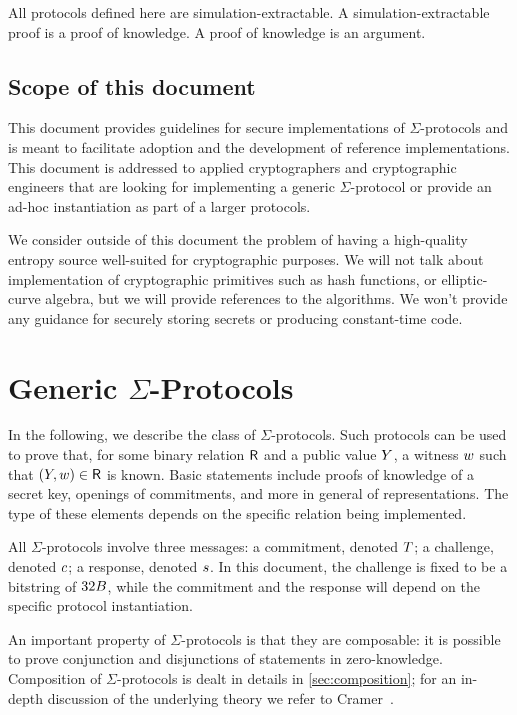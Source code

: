 \documentclass[11pt]{article}
\begin{document}
All protocols defined here are simulation-extractable. A simulation-extractable proof is a proof of knowledge. A proof of knowledge is an argument.

\subsection{Scope of this document}

This document provides guidelines for secure implementations of $\Sigma$-protocols and is meant to facilitate adoption and the development of reference implementations.
This document is addressed to applied cryptographers and cryptographic engineers that are looking for implementing a generic
$\Sigma$-protocol or provide an ad-hoc instantiation as part of a larger protocols.

We consider outside of this document the problem of having a high-quality
entropy source well-suited for crypto\-graphic purposes.
We will not talk about implementation of cryptographic primitives such as hash functions, or elliptic-curve algebra, but we will provide references to the algorithms.
We won't provide any guidance for securely storing secrets or producing constant-time code.

\section{Generic $\Sigma$-Protocols}
In the following, we describe the class of $\Sigma$-protocols.
Such protocols can be used to prove that, for some binary relation $\mathsf{R}$ and a public value $Y$, a witness $w$ such that $(Y,w)\in\mathsf{R}$ is known.
Basic statements include proofs of knowledge of a secret key, openings of commitments, and more in general of representations.
The type of these elements depends on the specific relation being implemented.

All $\Sigma$-protocols involve three messages: a commitment, denoted $T$; a challenge, denoted $c$; a response, denoted $s$.
In this document, the challenge is fixed to be a bitstring of $32B$,
while the commitment and the response will depend on the specific protocol instantiation.

An important property of $\Sigma$-protocols is that they are composable: it is possible to prove conjunction and disjunctions of statements in zero-knowledge.
Composition of $\Sigma$-protocols is dealt in details in \cref{sec:composition}; for an in-depth discussion of the underlying theory we refer to Cramer~\cite{cramer97}.
\end{document}
